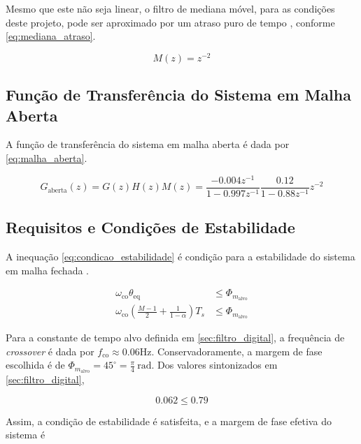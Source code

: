 \documentclass[conference,harvard,brazil,english]{sbatex}
\begin{document}
Mesmo que este não seja linear, o filtro de mediana móvel, para as condições deste projeto, pode ser aproximado por um atraso puro de tempo \cite{Geoffrine2011}, conforme \ref{eq:mediana_atraso}.

\begin{equation}
    \label{eq:mediana_atraso}
    M(z) = z^{-2}
\end{equation}

\subsection{Função de Transferência do Sistema em Malha Aberta}

A função de transferência do sistema em malha aberta é dada por \ref{eq:malha_aberta}.

\begin{equation}
    \label{eq:malha_aberta}
    G_\text{aberta}(z) = G(z) H(z) M(z) = \frac{-0.004z^{-1}}{1 - 0.997z^{-1}} \frac{0.12}{1 - 0.88 z^{-1}} z^{-2}
\end{equation}

\subsection{Requisitos e Condições de Estabilidade}

A inequação \ref{eq:condicao_estabilidade} é condição para a estabilidade do sistema em malha fechada \cite{Aguirre2023}.

\begin{align}
    \omega_\text{co} \theta_\text{eq} &\le \Phi_{m_\text{alvo}}  \label{eq:condicao_estabilidade} \\
    \omega_\text{co} \left( \frac{M - 1}{2} + \frac{1}{1 - \alpha} \right) T_s &\le \Phi_{m_\text{alvo}}
\end{align}

Para a constante de tempo alvo definida em \ref{sec:filtro_digital}, a frequência de \textit{crossover} é dada por $f_\text{co} \approx 0.06 \text{Hz}$. Conservadoramente, a margem de fase escolhida é de $\Phi_{m_\text{alvo}} = 45^\circ = \frac{\pi}{4}\ \text{rad}$. Dos valores sintonizados em \ref{sec:filtro_digital},

\begin{equation}
    \label{eq:condicao_estabilidate_satisfeita}
    0.062 \le 0.79
\end{equation}

Assim, a condição de estabilidade é satisfeita, e a margem de fase efetiva do sistema é
\end{document}
